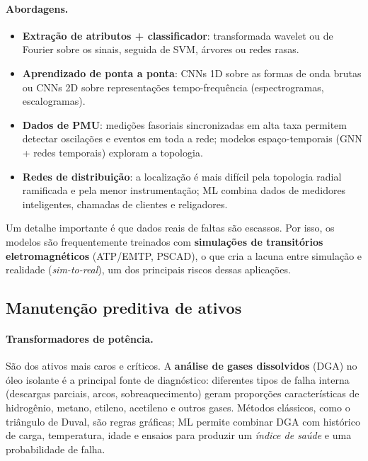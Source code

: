 \documentclass[10pt,a4paper,oneside]{article}
\begin{document}
\paragraph{Abordagens.}
\begin{itemize}
  \item \textbf{Extração de atributos + classificador}: transformada wavelet
    ou de Fourier sobre os sinais, seguida de SVM, árvores ou redes rasas.
  \item \textbf{Aprendizado de ponta a ponta}: CNNs 1D sobre as formas de onda
    brutas ou CNNs 2D sobre representações tempo-frequência (espectrogramas,
    escalogramas).
  \item \textbf{Dados de PMU}: medições fasoriais sincronizadas em alta taxa
    permitem detectar oscilações e eventos em toda a rede; modelos
    espaço-temporais (GNN + redes temporais) exploram a topologia.
  \item \textbf{Redes de distribuição}: a localização é mais difícil pela
    topologia radial ramificada e pela menor instrumentação; ML combina dados
    de medidores inteligentes, chamadas de clientes e religadores.
\end{itemize}

Um detalhe importante é que dados reais de faltas são escassos. Por isso,
os modelos são frequentemente treinados com \textbf{simulações de transitórios
eletromagnéticos} (ATP/EMTP, PSCAD), o que cria a lacuna entre simulação e
realidade (\textit{sim-to-real}), um dos principais riscos dessas aplicações.

\subsection{Manutenção preditiva de ativos}

\paragraph{Transformadores de potência.} São dos ativos mais caros e críticos.
A \textbf{análise de gases dissolvidos} (DGA) no óleo isolante é a principal
fonte de diagnóstico: diferentes tipos de falha interna (descargas parciais,
arcos, sobreaquecimento) geram proporções características de hidrogênio,
metano, etileno, acetileno e outros gases. Métodos clássicos, como o triângulo
de Duval, são regras gráficas; ML permite combinar DGA com histórico de carga,
temperatura, idade e ensaios para produzir um \textit{índice de saúde} e uma
probabilidade de falha.
\end{document}
